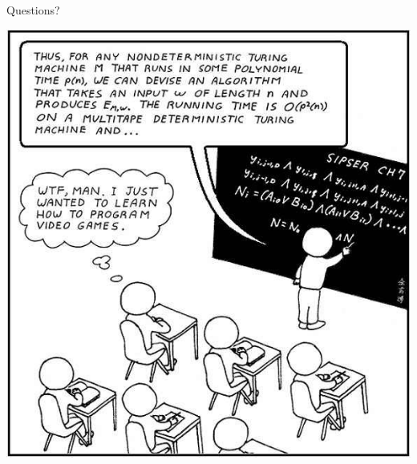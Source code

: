 \documentclass[pdf]{beamer}
\begin{document}
\begin{frame}{Questions?}
  \begin{center}
    \includegraphics[scale=0.32]{images/video-games}
  \end{center}
\end{frame}
\end{document}

